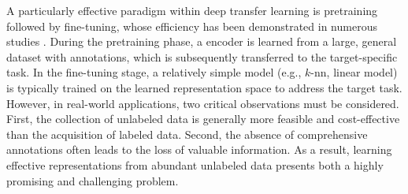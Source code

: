 A particularly effective paradigm within deep transfer learning is pretraining followed by fine-tuning, whose efficiency has been demonstrated in numerous studies \citep{schroff2015facenet, dhillon2020baseline, chen2019fewshot, chen2020newmeta}. During the pretraining phase, a encoder is learned from a large, general dataset with annotations, which is subsequently transferred to the target-specific task. In the fine-tuning stage, a relatively simple model (e.g., $k$-nn, linear model) is typically trained on the learned representation space to address the target task. However, in real-world applications, two critical observations must be considered. First, the collection of unlabeled data is generally more feasible and cost-effective than the acquisition of labeled data. Second, the absence of comprehensive annotations often leads to the loss of valuable information. As a result, learning effective representations from abundant unlabeled data presents both a highly promising and challenging problem.

